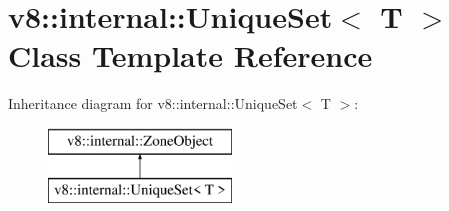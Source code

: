 \hypertarget{classv8_1_1internal_1_1_unique_set}{}\section{v8\+:\+:internal\+:\+:Unique\+Set$<$ T $>$ Class Template Reference}
\label{classv8_1_1internal_1_1_unique_set}
Inheritance diagram for v8\+:\+:internal\+:\+:Unique\+Set$<$ T $>$\+:\begin{figure}[H]
\begin{center}
\leavevmode
\includegraphics[height=2.000000cm]{classv8_1_1internal_1_1_unique_set}
\end{center}
\end{figure}
